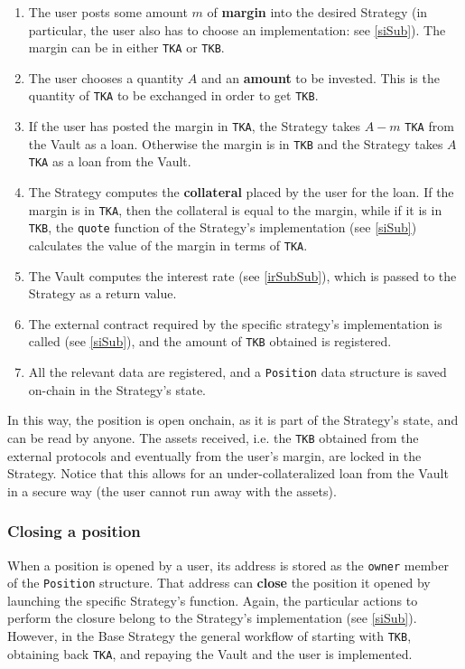 \documentclass[a4paper,10 pt]{article}
\theoremstyle{definition}
\begin{document}
\begin{enumerate}
\item The user posts some amount $m$ of {\bf margin} into the desired Strategy (in particular, the user also has to choose an implementation: see \ref{siSub}). The margin can be in either \verb|TKA| or \verb|TKB|.
\item The user chooses a quantity $A$ and an {\bf amount} to be invested. This is the quantity of \verb|TKA| to be exchanged in order to get \verb|TKB|.
\item If the user has posted the margin in \verb|TKA|, the Strategy takes $A-m$ \verb|TKA| from the Vault as a loan. Otherwise the margin is in \verb|TKB| and the Strategy takes $A$ \verb|TKA| as a loan from the Vault.
\item The Strategy computes the {\bf collateral} placed by the user for the loan. If the margin is in \verb|TKA|, then the collateral is equal to the margin, while if it is in \verb|TKB|, the \verb|quote| function of the Strategy's implementation (see \ref{siSub}) calculates the value of the margin in terms of \verb|TKA|.
\item The Vault computes the interest rate (see \ref{irSubSub}), which is passed to the Strategy as a return value.
\item The external contract required by the specific strategy's implementation is called (see \ref{siSub}), and the amount of \verb|TKB| obtained is registered.
\item All the relevant data are registered, and a \verb|Position| data structure is saved on-chain in the Strategy's state.
\end{enumerate}

In this way, the position is open onchain, as it is part of the Strategy's state, and can be read by anyone. The assets received, i.e. the \verb|TKB| obtained from the external protocols and eventually from the user's margin, are locked in the Strategy. Notice that this allows for an under-collateralized loan from the Vault in a secure way (the user cannot run away with the assets). 

\subsubsection{Closing a position}\label{cpSubSub}

When a position is opened by a user, its address is stored as the \verb|owner| member of the \verb|Position| structure. That address can {\bf close} the position it opened by launching the specific Strategy's function. Again, the particular actions to perform the closure belong to the Strategy's implementation (see \ref{siSub}). However, in the Base Strategy the general workflow of starting with \verb|TKB|, obtaining back \verb|TKA|, and repaying the Vault and the user is implemented.
\end{document}
